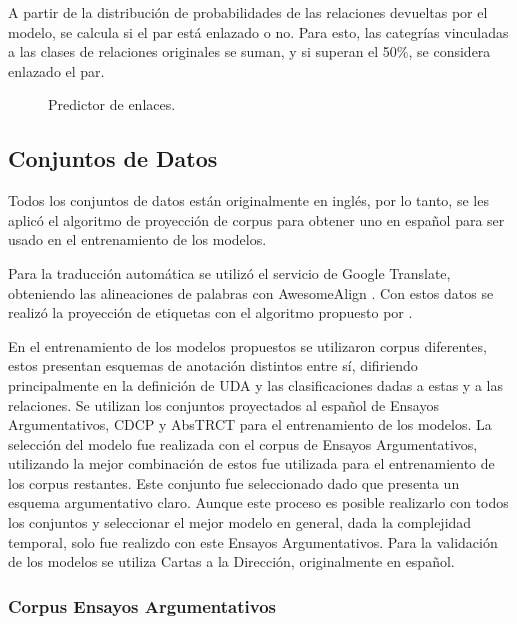 \documentclass{rcci} %
\begin{document}
A partir de la distribuci\'on de probabilidades de las relaciones devueltas por el modelo,
se calcula si el par est\'a enlazado o no. Para esto, las categr\'ias vinculadas a las clases de relaciones 
originales se suman, y si superan el 50\%, se considera enlazado el par.

\begin{figure}[!h]
	\begin{center}
		
		
	\end{center}
	\caption{\fontsize{11}{12}\selectfont Predictor de enlaces.}
	\label{fig:link_predictor_model1}
\end{figure}

\subsection*{Conjuntos de Datos}

Todos los conjuntos de datos est\'an originalmente en ingl\'es, por lo tanto, se les aplic\'o el algoritmo de proyecci\'on
de corpus para obtener uno en espa\~nol para ser usado en el entrenamiento de los modelos.

Para la traducci\'on autom\'atica se utiliz\'o el servicio de Google Translate,
obteniendo las alineaciones de palabras con AwesomeAlign \citep{dou2021word}.
Con estos datos se realiz\'o la proyecci\'on de etiquetas con el algoritmo propuesto 
por \citep{eger2018cross}.

En el entrenamiento de los modelos propuestos se utilizaron corpus diferentes, estos
presentan esquemas de anotaci\'on distintos entre s\'i, difiriendo principalmente en la definici\'on de UDA y 
las clasificaciones dadas a estas y a las relaciones. Se utilizan los conjuntos proyectados al español de 
Ensayos Argumentativos, CDCP y AbsTRCT para el entrenamiento de los modelos. La selección del
modelo fue realizada con el corpus de Ensayos Argumentativos, utilizando la mejor combinaci\'on de estos fue utilizada 
para el entrenamiento de los corpus restantes. Este conjunto fue seleccionado dado que presenta un esquema argumentativo
claro. Aunque este proceso es posible realizarlo con todos los conjuntos y seleccionar el mejor modelo en general, dada la 
complejidad temporal, solo fue realizdo con este Ensayos Argumentativos.
Para la validación de los modelos
se utiliza Cartas a la Dirección, originalmente en español.

\subsubsection*{Corpus Ensayos Argumentativos}\label{corpus:persuasive_essays}
\end{document}
